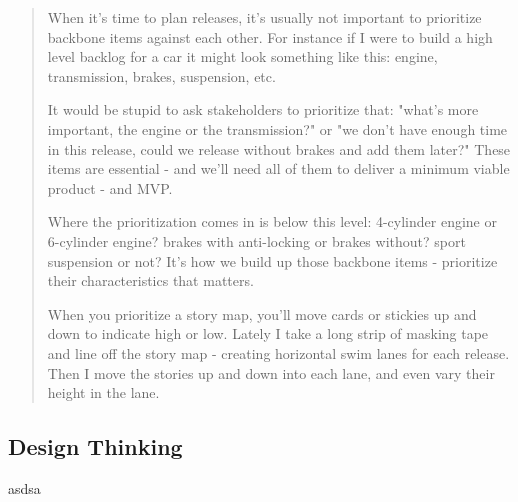 \blockquote{When it's time to plan releases, it's usually not important to prioritize backbone items against each other. For instance if I were to build a high level backlog for a car it might look something like this: engine, transmission, brakes, suspension, etc.

It would be stupid to ask stakeholders to prioritize that: "what's more important, the engine or the transmission?" or "we don't have enough time in this release, could we release without brakes and add them later?" These items are essential - and we'll need all of them to deliver a minimum viable product - and MVP.

Where the prioritization comes in is below this level: 4-cylinder engine or 6-cylinder engine? brakes with anti-locking or brakes without? sport suspension or not? It's how we build up those backbone items - prioritize their characteristics that matters.

When you prioritize a story map, you'll move cards or stickies up and down to indicate high or low. Lately I take a long strip of masking tape and line off the story map - creating horizontal swim lanes for each release. Then I move the stories up and down into each lane, and even vary their height in the lane.}

\subsection{Design Thinking}
asdsa